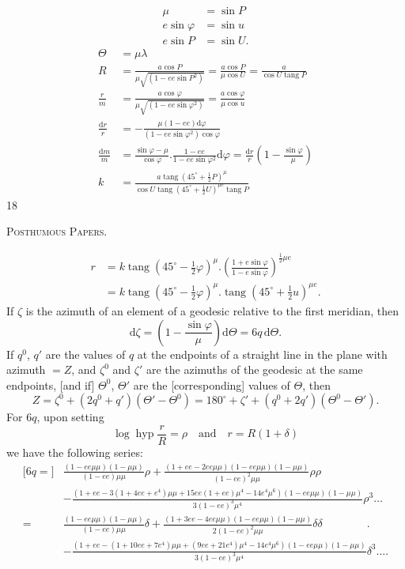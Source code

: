 \[
\begin{aligned}
\mu&=\sin P\\
e\sin\varphi&=\sin u\\
e\sin P&=\sin U.
\end{aligned}
\]
\[
\begin{aligned}
\Theta&=\mu\lambda\\[4pt]
R&=\frac{a\cos P}{\mu\sqrt{(1-ee\sin P^2)}}=\frac{a\cos P}{\mu\cos U}=\frac{a}{\cos U\operatorname{tang}P}\\[5pt]
\frac rm&=\frac{a\cos\varphi}{\mu\sqrt{(1-ee\sin\varphi^2)}}=\frac{a\cos\varphi}{\mu\cos u}\\[5pt]
\frac{\mathrm dr}{r}&=-\frac{\mu(1-ee)\mathrm d\varphi}{(1-ee\sin\varphi^2)\cos\varphi}\\[5pt]
\frac{\mathrm dm}{m}&=\frac{\sin\varphi-\mu}{\cos\varphi}.\frac{1-ee}{1-ee\sin\varphi^2}\mathrm d\varphi=\frac{\mathrm dr}{r}\left(1-\frac{\sin\varphi}{\mu}\right)\\[5pt]
k&=\frac{a\operatorname{tang}(45^\circ+\frac12P)^\mu}{\cos U\operatorname{tang}(45^\circ+\frac12U)^{\mu e}\operatorname{tang}P}
\end{aligned}
\]
\vfill{}\hfill18\hspace*{2cm}\par
\clearpage
{}\hfill\textsc{Posthumous Papers.}\hfill\mbox{}\par\medskip
\[
\begin{aligned}
r&=k\operatorname{tang}(45^\circ-\tfrac12\varphi)^\mu.\left(\frac{1+e\sin\varphi}{1-e\sin\varphi}\right)^{\frac12\mu e}\\
&=k\operatorname{tang}(45^\circ-\tfrac12\varphi)^\mu.\operatorname{tang}(45^\circ+\tfrac12u)^{\mu e}.
\end{aligned}
\]
If $\zeta$ is the azimuth of an element of a geodesic relative to the first meridian, then
\[
\mathrm d\zeta=\left(1-\frac{\sin\varphi}{\mu}\right)\mathrm d\Theta=6q\,\mathrm d\Theta.
\]
If $q^0$, $q'$ are the values of $q$ at the endpoints of a straight line in the plane with azimuth $=Z$, and $\zeta^0$ and $\zeta'$ are the azimuths of the geodesic at the same endpoints, [and if] $\Theta^0$, $\Theta'$ are the [corresponding] values of $\Theta$, then
\[
Z=\zeta^0+(2q^0+q')(\Theta'-\Theta^0)=180^\circ+\zeta'+(q^0+2q')(\Theta^0-\Theta').
\]
For $6q$, upon setting
\[
\log\operatorname{hyp}\frac rR=\rho\quad\text{and}\quad r=R(1+\delta)
\]
we have the following series:
\begingroup\footnotesize
\[
\begin{aligned}
{[}6q={]}&\frac{(1-ee\mu\mu)(1-\mu\mu)}{(1-ee)\mu\mu}\rho+\frac{(1+ee-2ee\mu\mu)(1-ee\mu\mu)(1-\mu\mu)}{(1-ee)^2\mu\mu}\rho\rho\\
&-\frac{(1+ee-3(1+4ee+e^4)\mu\mu+15ee(1+ee)\mu^4-14e^4\mu^6)(1-ee\mu\mu)(1-\mu\mu)}{3(1-ee)^3\mu^4}\rho^3\ldots\\[5pt]
=&\frac{(1-ee\mu\mu)(1-\mu\mu)}{(1-ee)\mu\mu}\delta+\frac{(1+3ee-4ee\mu\mu)(1-ee\mu\mu)(1-\mu\mu)}{2(1-ee)^2\mu\mu}\delta\delta\qquad\qquad .\\
&-\frac{(1+ee-(1+10ee+7e^4)\mu\mu+(9ee+21e^4)\mu^4-14e^4\mu^6)(1-ee\mu\mu)(1-\mu\mu)}{3(1-ee)^3\mu^4}\delta^3\ldots.
\end{aligned}
\]
